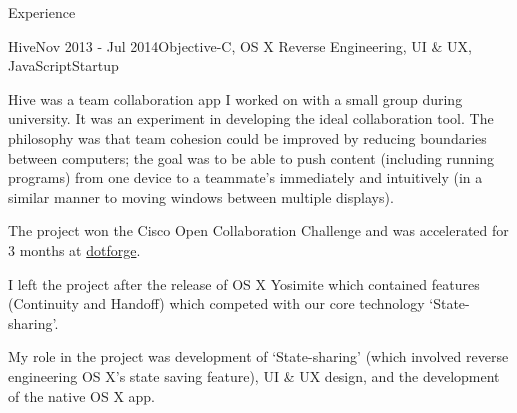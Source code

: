 \documentclass{resume} %
\begin{document}
\begin{rSection}{Experience}

\begin{rSubsection}{Hive}{Nov 2013 - Jul 2014}{Objective-C, OS X Reverse Engineering,  UI \& UX, JavaScript}{Startup}
\item Hive was a team collaboration app I worked on with a small group during university. It was an experiment in developing the ideal collaboration tool. The philosophy was that team cohesion could be improved by reducing boundaries between computers; the goal was to be able to push content (including running programs) from one device to a teammate's immediately and intuitively (in a similar manner to moving windows between multiple displays).
\item The project won the Cisco Open Collaboration Challenge and was accelerated for 3 months at \href{http://www.dotforge.com/}{dotforge}.
\item I left the project after the release of OS X Yosimite which contained features (Continuity and Handoff) which competed with our core technology `State-sharing'.
\item My role in the project was development of `State-sharing' (which involved reverse engineering OS X's state saving feature), UI \& UX design, and the development of the native OS X app.
\end{rSubsection}


\end{rSection}



\end{document}
